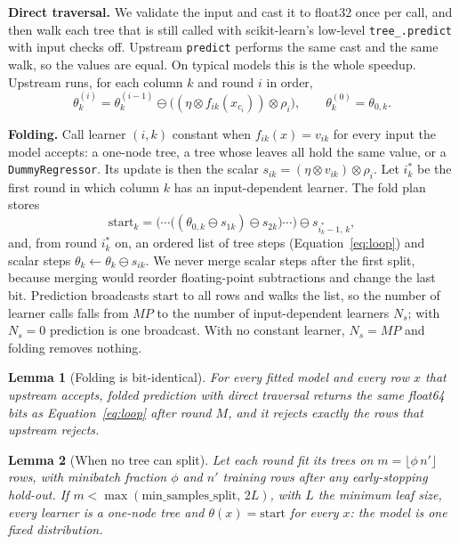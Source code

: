 \documentclass{article}
\newtheorem{lemma}{Lemma}
\newcommand{\fsub}{\ominus}
\newcommand{\fmul}{\otimes}
\begin{document}
\textbf{Direct traversal.} We validate the input and cast it to float32 once per call, and then walk each tree that is still called with scikit-learn's low-level \texttt{tree\_.predict} with input checks off. Upstream \texttt{predict} performs the same cast and the same walk, so the values are equal. On typical models this is the whole speedup.
Upstream runs, for each column $k$ and round $i$ in order,
\begin{equation}
\theta_k^{(i)} = \theta_k^{(i-1)} \fsub \big((\eta \fmul f_{ik}(x_{c_i})) \fmul \rho_i\big), \qquad \theta_k^{(0)} = \theta_{0,k}.
\label{eq:loop}
\end{equation}

\textbf{Folding.} Call learner $(i,k)$ constant when $f_{ik}(x) = v_{ik}$ for every input the model accepts: a one-node tree, a tree whose leaves all hold the same value, or a \texttt{DummyRegressor}. Its update is then the scalar $s_{ik} = (\eta \fmul v_{ik}) \fmul \rho_i$. Let $i^*_k$ be the first round in which column $k$ has an input-dependent learner. The fold plan stores
\begin{equation}
\text{start}_k = \big(\cdots\big((\theta_{0,k} \fsub s_{1k}) \fsub s_{2k}\big) \cdots\big) \fsub s_{i^*_k - 1,\,k},
\label{eq:start}
\end{equation}
and, from round $i^*_k$ on, an ordered list of tree steps (Equation~\eqref{eq:loop}) and scalar steps $\theta_k \leftarrow \theta_k \fsub s_{ik}$.
We never merge scalar steps after the first split, because merging would reorder floating-point subtractions and change the last bit.
Prediction broadcasts $\text{start}$ to all rows and walks the list, so the number of learner calls falls from $MP$ to the number of input-dependent learners $N_s$; with $N_s = 0$ prediction is one broadcast. With no constant learner, $N_s = MP$ and folding removes nothing.

\begin{lemma}[Folding is bit-identical]
\label{lem:fold}
For every fitted model and every row $x$ that upstream accepts, folded prediction with direct traversal returns the same float64 bits as Equation~\eqref{eq:loop} after round $M$, and it rejects exactly the rows that upstream rejects.
\end{lemma}

\begin{lemma}[When no tree can split]
\label{lem:bound}
Let each round fit its trees on $m = \lfloor \phi\, n' \rfloor$ rows, with minibatch fraction $\phi$ and $n'$ training rows after any early-stopping hold-out. If $m < \max(\text{min\_samples\_split},\, 2L)$, with $L$ the minimum leaf size, every learner is a one-node tree and $\theta(x) = \text{start}$ for every $x$: the model is one fixed distribution.
\end{lemma}
\end{document}
